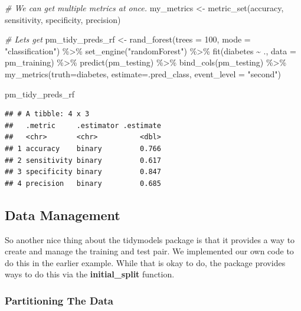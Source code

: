 \documentclass[
]{article}
\newenvironment{Shaded}{\begin{snugshade}}{\end{snugshade}}
\newcommand{\AttributeTok}[1]{\textcolor[rgb]{0.77,0.63,0.00}{#1}}
\newcommand{\CommentTok}[1]{\textcolor[rgb]{0.56,0.35,0.01}{\textit{#1}}}
\newcommand{\DecValTok}[1]{\textcolor[rgb]{0.00,0.00,0.81}{#1}}
\newcommand{\FunctionTok}[1]{\textcolor[rgb]{0.00,0.00,0.00}{#1}}
\newcommand{\NormalTok}[1]{#1}
\newcommand{\OtherTok}[1]{\textcolor[rgb]{0.56,0.35,0.01}{#1}}
\newcommand{\SpecialCharTok}[1]{\textcolor[rgb]{0.00,0.00,0.00}{#1}}
\newcommand{\StringTok}[1]{\textcolor[rgb]{0.31,0.60,0.02}{#1}}
\begin{document}
\begin{Shaded}
\begin{Highlighting}[]
\CommentTok{\# We can get multiple metrics at once.}
\NormalTok{my\_metrics }\OtherTok{\textless{}{-}} \FunctionTok{metric\_set}\NormalTok{(accuracy, sensitivity, specificity, precision)}

\CommentTok{\# Let\textquotesingle{}s get}
\NormalTok{pm\_tidy\_preds\_rf }\OtherTok{\textless{}{-}} \FunctionTok{rand\_forest}\NormalTok{(}\AttributeTok{trees =} \DecValTok{100}\NormalTok{, }\AttributeTok{mode =} \StringTok{"classification"}\NormalTok{) }\SpecialCharTok{\%\textgreater{}\%}
  \FunctionTok{set\_engine}\NormalTok{(}\StringTok{"randomForest"}\NormalTok{) }\SpecialCharTok{\%\textgreater{}\%}
  \FunctionTok{fit}\NormalTok{(diabetes }\SpecialCharTok{\textasciitilde{}}\NormalTok{ ., }\AttributeTok{data =}\NormalTok{ pm\_training) }\SpecialCharTok{\%\textgreater{}\%}
  \FunctionTok{predict}\NormalTok{(pm\_testing) }\SpecialCharTok{\%\textgreater{}\%}
  \FunctionTok{bind\_cols}\NormalTok{(pm\_testing) }\SpecialCharTok{\%\textgreater{}\%} 
  \FunctionTok{my\_metrics}\NormalTok{(}\AttributeTok{truth=}\NormalTok{diabetes, }\AttributeTok{estimate=}\NormalTok{.pred\_class, }\AttributeTok{event\_level =} \StringTok{"second"}\NormalTok{) }

\NormalTok{pm\_tidy\_preds\_rf}
\end{Highlighting}
\end{Shaded}

\begin{verbatim}
## # A tibble: 4 x 3
##   .metric     .estimator .estimate
##   <chr>       <chr>          <dbl>
## 1 accuracy    binary         0.766
## 2 sensitivity binary         0.617
## 3 specificity binary         0.847
## 4 precision   binary         0.685
\end{verbatim}

\hypertarget{data-management}{%
\subsection{Data Management}\label{data-management}}

So another nice thing about the tidymodels package is that it provides a
way to create and manage the training and test pair. We implemented our
own code to do this in the earlier example. While that is okay to do,
the package provides ways to do this via the \textbf{initial\_split}
function.

\hypertarget{partitioning-the-data}{%
\subsubsection{Partitioning The Data}\label{partitioning-the-data}}
\end{document}
